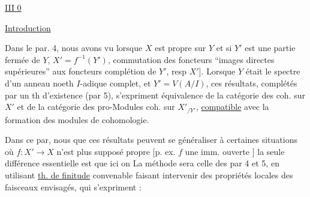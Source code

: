 
\uline{\uline{III} 0}

\uline{Introduction}

Dans le par. 4, nous avons vu  lorsque $X$ est propre sur $Y$     et si $Y'$ est une partie fermée de $Y$, $X'=f^{-1}(Y')$,   commutation des foncteurs  ``images directes supérieures'' aux foncteurs complétion  de $Y'$, resp $X'$]. Lorsque $Y$ était le spectre d'un anneau  noeth $I$-adique complet, et $Y'=V(A/I)$, ces résultats, complétés par un th d'existence (par 5), s'expriment     équivalence de la catégorie des   coh. sur $X'$ et de la catégorie des pro-Modules coh. sur $X'_{/Y'}$, \uline{compatible} avec la formation des modules de cohomologie.

Dans ce par, nous   que ces résultats peuvent se généraliser à certaines situations où $f:X'\to X$ n'est plus supposé propre [p. ex. $f$ une imm. ouverte ]  la seule différence essentielle est que  ici on 
La méthode sera  celle des par 4 et 5,  en utilisant   \uline{th. de finitude} convenable    faisant intervenir des propriétés   locales des faisceaux envisagés, qui s'expriment :


